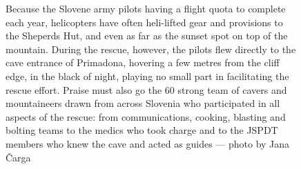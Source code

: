     \begin{figure}[b!]
        \checkoddpage \ifoddpage \forcerectofloat \else \forceversofloat \fi
        \centering
        \caption{Because the Slovene army pilots having a flight quota to complete each year, helicopters have often heli-lifted gear and provisions to the Sheperds Hut, and even as far as the sunset spot on top of the mountain. During the rescue, however, the pilots flew directly to the cave entrance of Primadona, hovering a few metres from the cliff edge, in the black of night, playing no small part in facilitating the rescue effort. Praise must also go the 60 strong team of cavers and mountaineers drawn from across Slovenia who participated in all aspects of the rescue: from communications, cooking, blasting and bolting teams to the medics who took charge and to the JSPDT members who knew the cave and acted as guides --- photo by Jana \v{C}arga}
        \label{helicopter}
    \end{figure}

